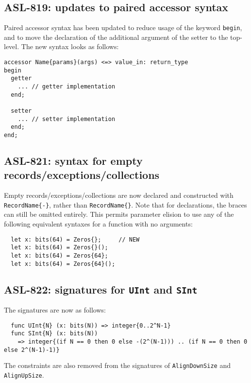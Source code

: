 \subsection{ASL-819: updates to paired accessor syntax}
Paired accessor syntax has been updated to reduce usage of the keyword \texttt{begin}, and to move the declaration of the additional argument of the setter to the top-level.
The new syntax looks as follows:
\begin{lstlisting}
accessor Name{params}(args) <=> value_in: return_type
begin
  getter
    ... // getter implementation
  end;

  setter
    ... // setter implementation
  end;
end;
\end{lstlisting}

\subsection{ASL-821: syntax for empty records/exceptions/collections}
Empty records/exceptions/collections are now declared and constructed with \texttt{RecordName\{-\}}, rather than \texttt{RecordName\{\}}.
Note that for declarations, the braces can still be omitted entirely.
This permits parameter elision to use any of the following equivalent syntaxes for a function with no arguments:
\begin{lstlisting}
  let x: bits(64) = Zeros{};     // NEW
  let x: bits(64) = Zeros{}();
  let x: bits(64) = Zeros{64};
  let x: bits(64) = Zeros{64}();
\end{lstlisting}

\subsection{ASL-822: signatures for \texttt{UInt} and \texttt{SInt}}
The signatures are now as follows:
\begin{lstlisting}
  func UInt{N} (x: bits(N)) => integer{0..2^N-1}
  func SInt{N} (x: bits(N))
    => integer{(if N == 0 then 0 else -(2^(N-1))) .. (if N == 0 then 0 else 2^(N-1)-1)}
\end{lstlisting}

The constraints are also removed from the signatures of \texttt{AlignDownSize} and \texttt{AlignUpSize}.

